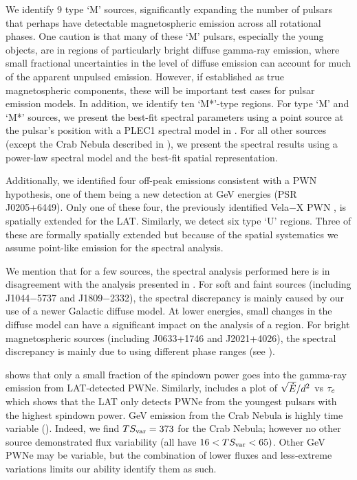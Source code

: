 We identify 9 type `M' sources,
significantly expanding the number of pulsars that perhaps have detectable magnetospheric emission across all rotational phases. 
One caution is that many of these `M' pulsars, especially the young objects, are in regions of particularly bright diffuse gamma-ray
emission, where small fractional uncertainties in the level of diffuse emission can account for much of the apparent unpulsed emission. 
However, if established as true magnetospheric components, these will be important test cases for
pulsar emission models. In addition, we identify ten
`M*'-type regions.
For type `M' and `M*' sources, we present the best-fit spectral parameters using
a point source at the pulsar's position with a PLEC1 spectral model in
.  For all other
sources (except the Crab Nebula described in ), 
we present the spectral results using a power-law spectral
model and the best-fit spatial representation.


Additionally, we identified four off-peak emissions consistent with a PWN
hypothesis, one of them being a new detection at GeV energies (PSR J0205+6449).
Only one of these four, the previously identified Vela$-$X PWN \citep{abdo_2010c_fermi-large}, is spatially extended for the LAT.
Similarly, we detect six type `U' regions. Three of these are formally 
spatially extended
but because of the spatial systematics 
we assume point-like emission for the spectral analysis.

We mention that for a few sources, the spectral analysis
performed here is in disagreement with the analysis presented in
\citet{ackermann_2011a_fermi-lat-search}. For soft and faint sources
(including J1044$-$5737 and J1809$-$2332), the spectral discrepancy is
mainly caused by our use of a newer Galactic diffuse model. At lower
energies, small changes in the diffuse model can have a significant
impact on the analysis of a region.  For bright magnetospheric sources
(including J0633+1746 and J2021+4026), the spectral discrepancy is mainly
due to using different phase ranges (see ).


 shows that only
a small fraction of the spindown power goes into 
the gamma-ray emission from LAT-detected PWNe.
Similarly, 
\cite{abdo_2013a_second-fermi} includes a plot of $\sqrt{\dot{E}}/d^2$ vs $\tau_c$
which shows that the LAT only detects
PWNe from the youngest pulsars with the highest spindown power.
GeV emission from the Crab Nebula is highly time variable ().  
Indeed, we find
$TS_{\rm var}=373$ for the Crab Nebula; however
no other source demonstrated flux variability (all have $16 <TS_{\rm var} <65)$.  
Other GeV PWNe may be variable, but the combination of lower fluxes
and less-extreme variations limits our ability identify them as such.


